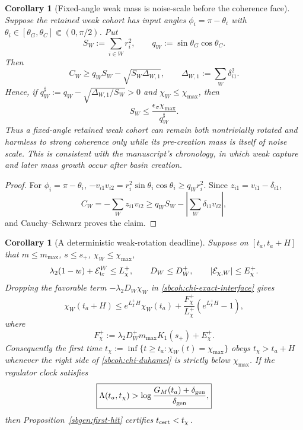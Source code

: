 \documentclass{article} %
\theoremstyle{plain}
\newtheorem{corollary}[theorem]{Corollary}
\theoremstyle{definition}
\theoremstyle{remark}
\begin{document}
\begin{corollary}[Fixed-angle weak mass is noise-scale before the coherence face]
\label{sbcoh:weak-mass-compat}
Suppose the retained weak cohort has input angles
$\phi_i=\pi-\theta_i$ with
$\theta_i\in[\theta_G,\theta_C]\Subset(0,\pi/2)$.  Put
\[
 S_W:=\sum_{i\in W}r_i^2,
 \qquad
 q_W:=\sin\theta_G\cos\theta_C.
\]
Then
\begin{equation}\label{sbcoh:CW-angle-lower}
 C_W
 \ge q_WS_W-\sqrt{S_W\Delta_{W,1}},
 \qquad
 \Delta_{W,1}:=\sum_W\delta_{i1}^2.
\end{equation}
Hence, if
$q_W^\sharp:=q_W-\sqrt{\Delta_{W,1}/S_W}>0$ and
$\chi_W\le\chi_{\max}$, then
\begin{equation}\label{sbcoh:weak-mass-noise-scale}
 \boxed{
 S_W\le\frac{\epsilon_\sigma\chi_{\max}}{q_W^\sharp}.
 }
\end{equation}
Thus a fixed-angle retained weak cohort can remain both nontrivially rotated
and harmless to strong coherence only while its pre-creation mass is itself
of noise scale.  This is consistent with the manuscript's chronology, in
which weak capture and later mass growth occur after basin creation.
\end{corollary}

\begin{proof}
For $\phi_i=\pi-\theta_i$,
$-v_{i1}v_{i2}=r_i^2\sin\theta_i\cos\theta_i\ge q_Wr_i^2$.
Since $z_{i1}=v_{i1}-\delta_{i1}$,
\[
 C_W=-\sum_Wz_{i1}v_{i2}
 \ge q_WS_W-\left|\sum_W\delta_{i1}v_{i2}\right|,
\]
and Cauchy--Schwarz proves the claim.
\end{proof}

\begin{corollary}[A deterministic weak-rotation deadline]
\label{sbcoh:chi-deadline}
Suppose on $[t_a,t_a+H]$ that
$m\le m_{\max}$, $s\le s_+$, $\chi_W\le\chi_{\max}$,
\[
 \lambda_2(1-w)+\mathcal E_{\rm tr}^W\le L_\chi^+,
 \qquad
 D_W\le D_W^+,
 \qquad
 |\mathcal E_{\chi,W}|\le E_\chi^+.
\]
Dropping the favorable term $-\lambda_2D_W\chi_W$ in
\eqref{sbcoh:chi-exact-interface} gives
\begin{equation}\label{sbcoh:chi-duhamel}
 \boxed{
 \chi_W(t_a+H)
 \le e^{L_\chi^+H}\chi_W(t_a)
 +\frac{F_\chi^+}{L_\chi^+}(e^{L_\chi^+H}-1),
 }
\end{equation}
where
\[
 F_\chi^+:=\lambda_2D_W^+m_{\max}K_1(s_+)+E_\chi^+.
\]
Consequently the first time
$t_\chi:=\inf\{t\ge t_a:\chi_W(t)=\chi_{\max}\}$
obeys $t_\chi>t_a+H$ whenever the right side of
\eqref{sbcoh:chi-duhamel} is strictly below $\chi_{\max}$.
If the regulator clock satisfies
\begin{equation}\label{sbcoh:chi-before-hit-clock}
 \boxed{
 \Lambda(t_a,t_\chi)
 >\log\frac{G_M(t_a)+\delta_{\rm gen}}{\delta_{\rm gen}},
 }
\end{equation}
then Proposition~\ref{sbgen:first-hit} certifies
$t_{\rm cert}<t_\chi$.
\end{corollary}
\end{document}
